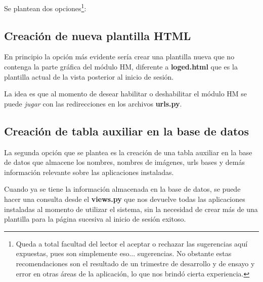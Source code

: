 \documentclass[9pt, letterpaper, oneside]{report}
\begin{document}
    Se plantean dos opciones\footnote{Queda a total facultad del lector el
    aceptar o rechazar las sugerencias aquí expuestas, pues son simplemente eso...
    sugerencias. No obstante estas recomendaciones son el resultado de un trimestre
    de desarrollo y de ensayo y error en otras áreas de la aplicación, lo que nos
    brindó cierta experiencia.}:
    
    \subsection{Creación de nueva plantilla HTML}
    
    En principio la opción más evidente sería crear una plantilla nueva que no
    contenga la parte gráfica del módulo HM, diferente a \textbf{loged.html} que
    es la plantilla actual de la vista posterior al inicio de sesión.
    
    La idea es que al momento de desear habilitar o deshabilitar el módulo HM
    se puede \emph{jugar} con las redirecciones en los archivos \textbf{urls.py}.
    
    \subsection{Creación de tabla auxiliar en la base de datos}

  	La segunda opción que se plantea es la creación de una tabla auxiliar en la
  	base de datos que almacene los nombres, nombres de imágenes, urls bases y demás
  	información relevante sobre las aplicaciones instaladas.
  	
  	Cuando ya se tiene la información almacenada en la base de datos, se puede hacer
  	una consulta desde el \textbf{views.py} que nos devuelve todas las aplicaciones
  	instaladas al momento de utilizar el sistema, sin la necesidad de crear más de
  	una plantilla para la página sucesiva al inicio de sesión exitoso.
  	
  	
\end{document}
